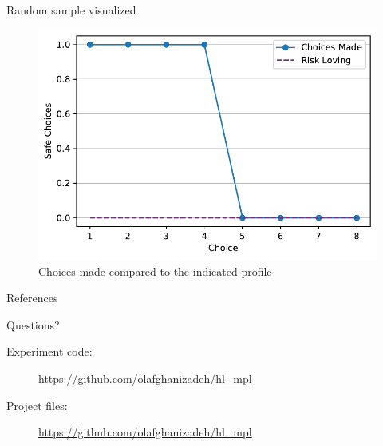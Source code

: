 \documentclass[10pt]{beamer}
\begin{document}
\begin{frame}{Random sample visualized}
  \begin{figure}[H]
  \includegraphics[width=0.9\columnwidth]{graphics/random_plot.pdf}
  \caption{Choices made compared to the indicated profile}
\end{figure}
\end{frame}

\begin{frame}
  \Huge
\end{frame}












\begin{frame}{References}
  \printbibliography[heading=none]
\end{frame}




{
\begin{frame}[standout]
  Questions?
  \begin{description}
      \item[Experiment code:] \url{https://github.com/olafghanizadeh/hl_mpl}
      \item[Project files:] \url{https://github.com/olafghanizadeh/hl_mpl}
  \end{description}
\end{frame}
}
\end{document}
